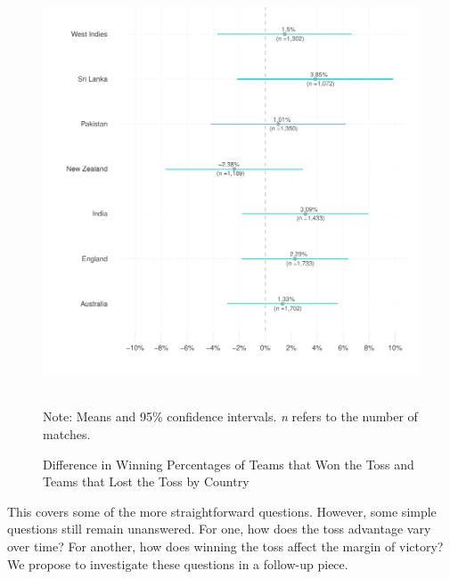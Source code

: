 \documentclass[12pt]{article}
\begin{document}
\begin{figure}[htbp]
\centering
\caption{Difference in Winning Percentages of Teams that Won the Toss and Teams that Lost the Toss by Country}
\includegraphics[scale=1]{../figs/winbyCountry.pdf}
{\footnotesize \\ Note: Means and 95\% confidence intervals. \emph{n} refers to the number of matches.\par}
\label{fig:country}
\end{figure}

This covers some of the more straightforward questions. However, some simple questions still remain unanswered. For one, how does the toss advantage vary over time? For another, how does winning the toss affect the margin of victory?  We propose to investigate these questions in a follow-up piece.

\clearpage


\end{document}
